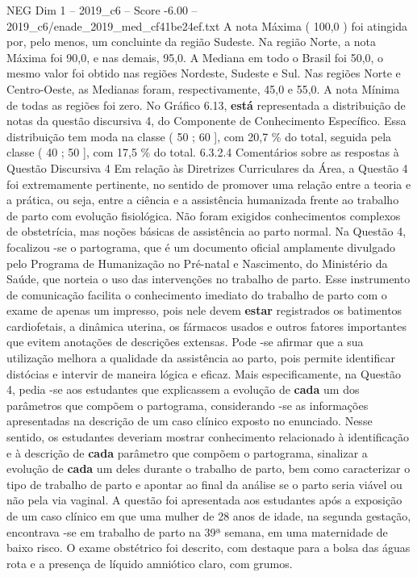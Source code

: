 \begin{textsample}{NEG Dim 1 – 2019\_c6 – Score -6.00 – 2019\_c6/enade\_2019\_med\_cf41be24ef.txt}
A nota Máxima ( 100,0 ) foi atingida por, pelo menos, um concluinte da região Sudeste.
Na região Norte, a nota Máxima foi 90,0, e nas demais, 95,0.
A Mediana em todo o Brasil foi 50,0, o mesmo valor foi obtido nas regiões Nordeste, Sudeste e Sul.
Nas regiões Norte e Centro-Oeste, as Medianas foram, respectivamente, 45,0 e 55,0.
A nota Mínima de todas as regiões foi zero.
No Gráfico 6.13, \textbf{está} representada a distribuição de notas da questão discursiva 4, do Componente de Conhecimento Específico.
Essa distribuição tem moda na classe ( 50 ; 60 ], com 20,7 \% do total, seguida pela classe ( 40 ; 50 ], com 17,5 \% do total. 6.3.2.4 Comentários sobre as respostas à Questão Discursiva 4 Em relação às Diretrizes Curriculares da Área, a Questão 4 foi extremamente pertinente, no sentido de promover uma relação entre a teoria e a prática, ou seja, entre a ciência e a assistência humanizada frente ao trabalho de parto com evolução fisiológica.
Não foram exigidos conhecimentos complexos de obstetrícia, mas noções básicas de assistência ao parto normal.
Na Questão 4, focalizou -se o partograma, que é um documento oficial amplamente divulgado pelo Programa de Humanização no Pré-natal e Nascimento, do Ministério da Saúde, que norteia o uso das intervenções no trabalho de parto.
Esse instrumento de comunicação facilita o conhecimento imediato do trabalho de parto com o exame de apenas um impresso, pois nele devem \textbf{estar} registrados os batimentos cardiofetais, a dinâmica uterina, os fármacos usados e outros fatores importantes que evitem anotações de descrições extensas.
Pode -se afirmar que a sua utilização melhora a qualidade da assistência ao parto, pois permite identificar distócias e intervir de maneira lógica e eficaz.
Mais especificamente, na Questão 4, pedia -se aos estudantes que explicassem a evolução de \textbf{cada} um dos parâmetros que compõem o partograma, considerando -se as informações apresentadas na descrição de um caso clínico exposto no enunciado.
Nesse sentido, os estudantes deveriam mostrar conhecimento relacionado à identificação e à descrição de \textbf{cada} parâmetro que compõem o partograma, sinalizar a evolução de \textbf{cada} um deles durante o trabalho de parto, bem como caracterizar o tipo de trabalho de parto e apontar ao final da análise se o parto seria viável ou não pela via vaginal.
A questão foi apresentada aos estudantes após a exposição de um caso clínico em que uma mulher de 28 anos de idade, na segunda gestação, encontrava -se em trabalho de parto na 39ª semana, em uma maternidade de baixo risco.
O exame obstétrico foi descrito, com destaque para a bolsa das águas rota e a presença de líquido amniótico claro, com grumos.

\end{textsample}
